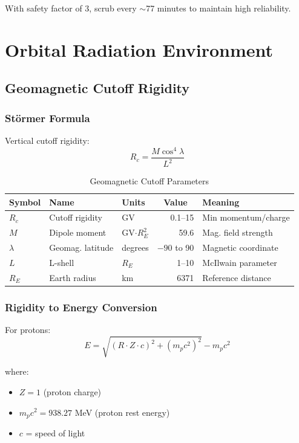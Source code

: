 \documentclass[11pt,a4paper]{article}
\begin{document}
With safety factor of 3, scrub every $\sim$77 minutes to maintain high reliability.

\newpage
\section{Orbital Radiation Environment}

\subsection{Geomagnetic Cutoff Rigidity}

\subsubsection{Störmer Formula}

Vertical cutoff rigidity:
\begin{equation}
R_c = \frac{M \cos^4 \lambda}{L^2}
\end{equation}

\begin{table}[htbp]
\centering
\caption{Geomagnetic Cutoff Parameters}
\begin{tabular}{@{}lllrl@{}}
\toprule
\textbf{Symbol} & \textbf{Name} & \textbf{Units} & \multicolumn{1}{c}{\textbf{Value}} & \textbf{Meaning} \\ \midrule
$R_c$ & Cutoff rigidity & GV & 0.1--15 & Min momentum/charge \\
$M$ & Dipole moment & GV$\cdot R_E^2$ & 59.6 & Mag. field strength \\
$\lambda$ & Geomag. latitude & degrees & $-90$ to 90 & Magnetic coordinate \\
$L$ & L-shell & $R_E$ & 1--10 & McIlwain parameter \\
$R_E$ & Earth radius & km & 6371 & Reference distance \\ \bottomrule
\end{tabular}
\end{table}

\subsubsection{Rigidity to Energy Conversion}

For protons:
\begin{equation}
E = \sqrt{(R \cdot Z \cdot c)^2 + (m_p c^2)^2} - m_p c^2
\end{equation}

where:
\begin{itemize}
    \item $Z = 1$ (proton charge)
    \item $m_p c^2 = 938.27$ MeV (proton rest energy)
    \item $c$ = speed of light
\end{itemize}
\end{document}
